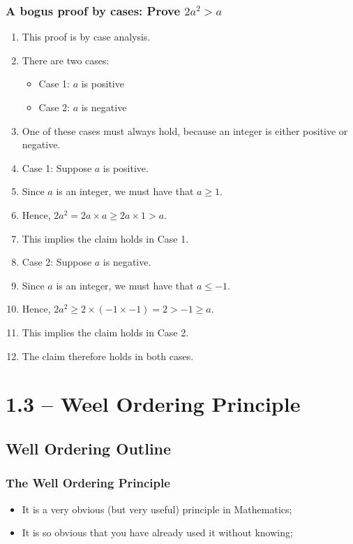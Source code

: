\documentclass{beamer}
\begin{document}
\begin{frame}
  \frametitle{A bogus proof by cases: Prove $2a^2 > a$}
  \begin{enumerate}
  \item This proof is by case analysis.
  \item There are two cases:
    \begin{itemize}
      \item Case 1: $a$ is positive
      \item Case 2: $a$ is negative
    \end{itemize}
  \item One of these cases must always hold, because an integer is either positive or negative.
  \item Case 1: Suppose $a$ is positive.
  \item Since $a$ is an integer, we must have that $a \geq 1$.
  \item Hence, $2a^2 = 2a\times a \geq 2a\times 1 > a$.
  \item This implies the claim holds in Case 1.
  \item Case 2: Suppose $a$ is negative.
  \item Since $a$ is an integer, we must have that $a \leq -1$.
  \item Hence, $2a^2 \geq 2\times (-1 \times -1) = 2 > -1 \geq a$.
  \item This implies the claim holds in Case 2.
  \item The claim therefore holds in both cases. 
  \end{enumerate}
\end{frame}

\section{1.3 -- Weel Ordering Principle}
\subsection{Well Ordering Outline}

\begin{frame}
  \frametitle{The Well Ordering Principle}

  \begin{itemize}
  \item It is a very obvious (but very useful) principle in Mathematics;
    \bigskip
    
  \item It is so obvious that you have already used it without knowing;
  \end{itemize}
  
\end{frame}
\end{document}
